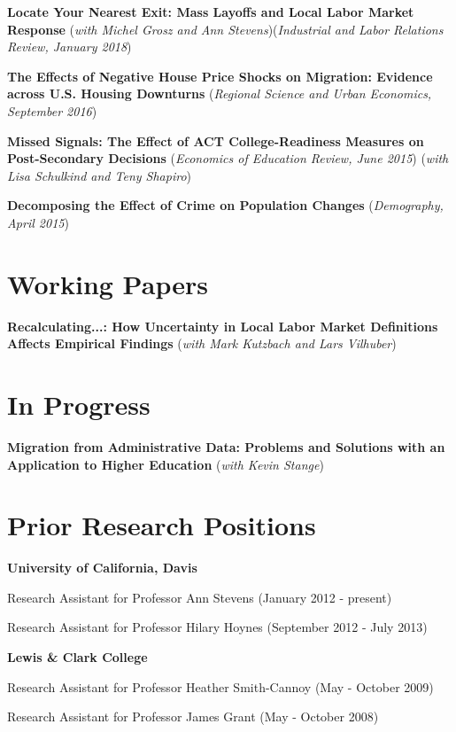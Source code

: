 \documentclass[margin,line]{res}
\newenvironment{list1}{
  \begin{list}{\ding{113}}{%
      \setlength{\itemsep}{0in}
      \setlength{\parsep}{0in} \setlength{\parskip}{0in}
      \setlength{\topsep}{0in} \setlength{\partopsep}{0in} 
      \setlength{\leftmargin}{0.17in}}}{\end{list}}
\begin{document}
\begin{resume}
\textbf{Locate Your Nearest Exit: Mass Layoffs and Local Labor Market Response} (\emph{with Michel Grosz and Ann Stevens})(\emph{Industrial and Labor Relations Review, January 2018})

\textbf{The Effects of Negative House Price Shocks on Migration: Evidence across U.S. Housing Downturns} (\textit{Regional Science and Urban Economics, September 2016})

\textbf{Missed Signals: The Effect of ACT College-Readiness Measures on Post-Secondary Decisions} (\textit{Economics of Education Review, June 2015}) (\emph{with Lisa Schulkind and Teny Shapiro})

\textbf{Decomposing the Effect of Crime on Population Changes} (\textit{Demography, April 2015})\\

\section{\sc Working Papers}


\textbf{Recalculating...: How Uncertainty in Local Labor Market Definitions Affects Empirical Findings} (\emph{with Mark Kutzbach and Lars Vilhuber})

\section{\sc In Progress}

\textbf{Migration from Administrative Data: Problems and Solutions with an Application to Higher Education} (\emph{with Kevin Stange})


%
\section{\sc Prior Research Positions}
\textbf{University of California, Davis}
\begin{list1}
	\item[] Research Assistant for Professor Ann Stevens (January 2012 - present)
	\item[] Research Assistant for Professor Hilary Hoynes (September 2012 - July 2013)
\end{list1}
\vspace*{-.1in}

\textbf{Lewis \& Clark College}
\begin{list1}
 \setlength{\itemsep}{0cm}%
  \setlength{\parskip}{0cm}%
	\item[] Research Assistant for Professor Heather Smith-Cannoy (May - October 2009)
	\item[] Research Assistant for Professor James Grant (May - October 2008)
\end{list1}


\end{resume}
\end{document}
